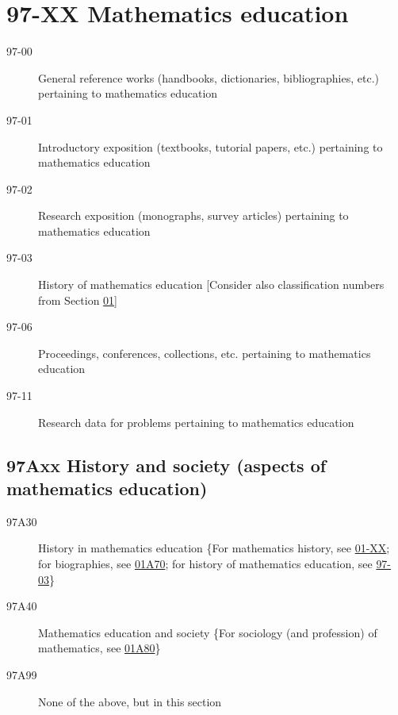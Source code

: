 \section*{97-XX Mathematics education }\label{97-XX}
\begin{description}
\item [97-00]\label{97-00} General reference works (handbooks, dictionaries, bibliographies, etc.) pertaining to mathematics education
\item [97-01]\label{97-01} Introductory exposition (textbooks, tutorial papers, etc.) pertaining to mathematics education
\item [97-02]\label{97-02} Research exposition (monographs, survey articles) pertaining to mathematics education
\item [97-03]\label{97-03} History of mathematics education [Consider also classification numbers from Section \hyperref[01-XX]{01}]
\item [97-06]\label{97-06} Proceedings, conferences, collections, etc. pertaining to mathematics education
\item [97-11]\label{97-11} Research data for problems pertaining to mathematics education
\end{description}
\subsection*{97Axx  History and society (aspects of mathematics education) }\label{97Axx}
\begin{description}  
\item [97A30]\label{97A30} History in mathematics education \{For mathematics history, see \hyperref[01-XX]{01-XX}; for biographies, see \hyperref[01A70]{01A70}; for history of mathematics education, see \hyperref[97-03]{97-03}\}
\item [97A40]\label{97A40} Mathematics education and society \{For sociology (and profession) of mathematics, see \hyperref[01A80]{01A80}\}
\item [97A99]\label{97A99} None of the above, but in this section
\end{description}
